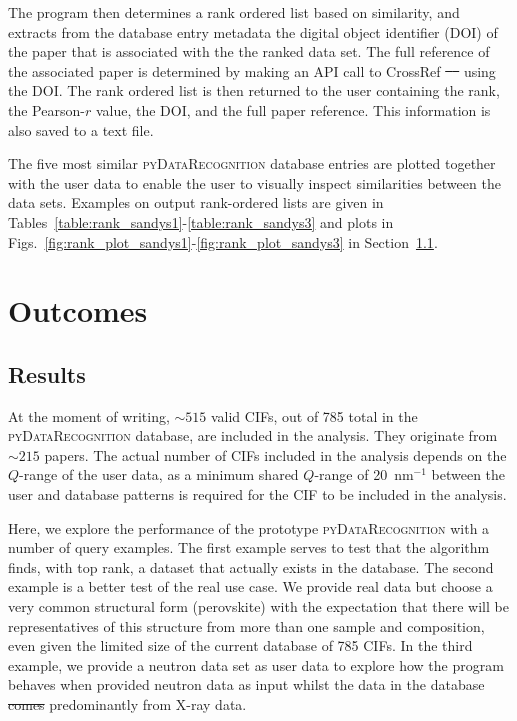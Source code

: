 \documentclass[preprint]{iucr}
\newcommand{\done}{\textcolor{dgreen}{{\large{$\checkmark$}}}}
\newcommand{\figs}[1]{Figs.~\ref{fig:#1}}
\newcommand{\pydr}{\textsc{pyDataRecognition}\xspace}
\providecommand{\DIFadd}[1]{{\protect\color{blue}\uwave{#1}}} %
\providecommand{\DIFdel}[1]{{\protect\color{red}\sout{#1}}}                      %
\providecommand{\DIFaddbegin}{} %
\providecommand{\DIFaddend}{} %
\providecommand{\DIFdelbegin}{} %
\providecommand{\DIFdelend}{} %
\newcommand{\DIFscaledelfig}{0.5}
\newlength{\DIFdelgraphicswidth} %
\newlength{\DIFdelgraphicsheight} %
\newcommand{\DIFaddincludegraphics}[2][]{{\color{blue}\fbox{\DIFOincludegraphics[#1]{#2}}}} %
\newcommand{\DIFdelincludegraphics}[2][]{%
\sbox{\DIFdelgraphicsbox}{\DIFOincludegraphics[#1]{#2}}%
\settoboxwidth{\DIFdelgraphicswidth}{\DIFdelgraphicsbox} %
\settoboxtotalheight{\DIFdelgraphicsheight}{\DIFdelgraphicsbox} %
\scalebox{\DIFscaledelfig}{%
\parbox[b]{\DIFdelgraphicswidth}{\usebox{\DIFdelgraphicsbox}\\[-\baselineskip] \rule{\DIFdelgraphicswidth}{0em}}\llap{\resizebox{\DIFdelgraphicswidth}{\DIFdelgraphicsheight}{%
\setlength{\unitlength}{\DIFdelgraphicswidth}%
\begin{picture}(1,1)%
\thicklines\linethickness{2pt} %
{\color[rgb]{1,0,0}\put(0,0){\framebox(1,1){}}}%
{\color[rgb]{1,0,0}\put(0,0){\line( 1,1){1}}}%
{\color[rgb]{1,0,0}\put(0,1){\line(1,-1){1}}}%
\end{picture}%
}\hspace*{3pt}}} %
} %
\DeclareRobustCommand{\DIFaddbegin}{\DIFOaddbegin \let\includegraphics\DIFaddincludegraphics} %
\DeclareRobustCommand{\DIFaddend}{\DIFOaddend \let\includegraphics\DIFOincludegraphics} %
\DeclareRobustCommand{\DIFdelbegin}{\DIFOdelbegin \let\includegraphics\DIFdelincludegraphics} %
\DeclareRobustCommand{\DIFdelend}{\DIFOaddend \let\includegraphics\DIFOincludegraphics} %
\begin{document}
The program then determines a rank ordered list based on similarity, and extracts from the database entry metadata the digital object identifier (DOI) \cite{paskinUniqueIdentifiers1999} of the paper that is associated with the the ranked data set.  The full reference of the associated paper is determined by making an API call to CrossRef \DIFdelbegin \DIFdel{\mbox{%
\cite{crossrefCrossrefRESTAPI2022} }\hspace{0pt}%
}\DIFdelend \DIFaddbegin \DIFadd{\mbox{%
\cite{crossrefRESTAPI2020} }\hspace{0pt}%
}\DIFaddend using the DOI.   The rank ordered list is then returned  to the user containing the rank, the Pearson-$r$ value, the DOI, and the full paper reference.  This information is also saved to a text file.

The five most similar \pydr database entries are plotted together with the user data to enable the user to visually inspect similarities between the data sets. 
Examples on output rank-ordered lists are given in Tables~\ref{table:rank_sandys1}-\ref{table:rank_sandys3} and plots in \figs{rank_plot_sandys1}-\ref{fig:rank_plot_sandys3} in Section~\ref{sec:results}.

\section{Outcomes}
\label{sec:outcomes}
\subsection{Results}
\label{sec:results}

At the moment of writing, $\sim515$ valid CIFs, out of 785 total in the \pydr database, are included in the analysis. They originate from $\sim215$ papers. The actual number of CIFs included in the analysis depends on the $Q$-range of the user data, as a minimum shared $Q$-range of 20~nm$^{-1}$ between the user and database patterns is required for the CIF to be included in the analysis.

Here, we explore the performance of the prototype \pydr with a number of query examples. The first example serves to test that the algorithm finds, with top rank, a dataset that actually exists in the database. The second example is a better test of the real use case. We provide real data but choose a very common structural form (perovskite) with the expectation that there will be representatives of this structure from more than one sample and composition, even given the  limited size of the current database of 785 CIFs. In the third example, we provide a neutron data set as user data to explore how the program behaves when provided neutron data as input whilst the data in the database \DIFdelbegin \DIFdel{comes }\DIFdelend \DIFaddbegin \DIFadd{come }\DIFaddend predominantly from X-ray data.
\end{document}

